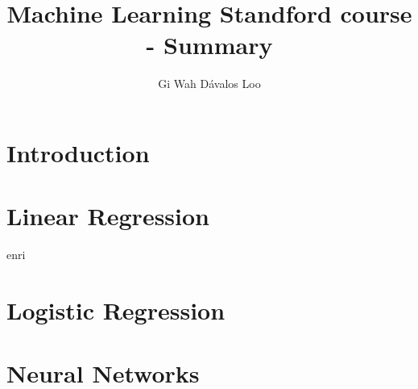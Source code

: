 \documentclass[12pt,a4paper]{article}
\title{Machine Learning Standford course - Summary}
\author{Gi Wah Dávalos Loo \textleaf}
\begin{document}
\maketitle


\section{Introduction}


\section{Linear Regression}enri


\section{Logistic Regression}


\section{Neural Networks}

\end{document}
